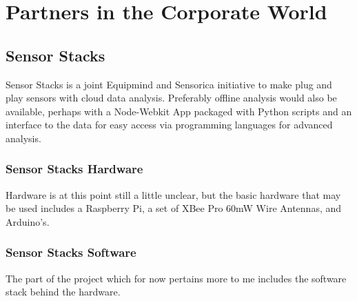 \section{Partners in the Corporate World}

	\subsection{Sensor Stacks}
	
		Sensor Stacks is a joint Equipmind and Sensorica initiative to make plug and play sensors with cloud data analysis.
		Preferably offline analysis would also be available, perhaps with a Node-Webkit App packaged with Python scripts and an interface to the data for easy access via programming languages for advanced analysis.
		
	\subsubsection{Sensor Stacks Hardware}
		
		Hardware is at this point still a little unclear, but the basic hardware that may be used includes a Raspberry Pi, a set of XBee Pro 60mW Wire Antennas, and Arduino's.
		
	\subsubsection{Sensor Stacks Software}		
			
		The part of the project which for now pertains more to me includes the software stack behind the hardware.
		
